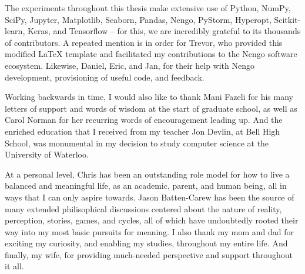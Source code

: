 \newpage

The experiments throughout this thesis make extensive use of Python, NumPy, SciPy, Jupyter, Matplotlib, Seaborn, Pandas, Nengo, PyStorm, Hyperopt, Scitkit-learn, Keras, and Tensorflow -- for this, we are incredibly grateful to its thousands of contributors.
A repeated mention is in order for Trevor, who provided this modified \LaTeX{} template and facilitated my contributions to the Nengo software ecosystem.
Likewise, Daniel, Eric, and Jan, for their help with Nengo development, provisioning of useful code, and feedback.

Working backwards in time, I would also like to thank Mani Fazeli for his many letters of support and words of wisdom at the start of graduate school, as well as Carol Norman for her recurring words of encouragement leading up.
And the enriched education that I received from my teacher Jon Devlin, at Bell High School, was monumental in my decision to study computer science at the University of Waterloo.

At a personal level, Chris has been an outstanding role model for how to live a balanced and meaningful life, as an academic, parent, and human being, all in ways that I can only aspire towards.
Jason Batten-Carew has been the source of many extended philisophical discussions centered about the nature of reality, perception, stories, games, and cycles, all of which have undoubtedly rooted their way into my most basic pursuits for meaning.
I also thank my mom and dad for exciting my curiosity, and enabling my studies, throughout my entire life.
And finally, my wife, for providing much-needed perspective and support throughout it all.

\cleardoublepage
